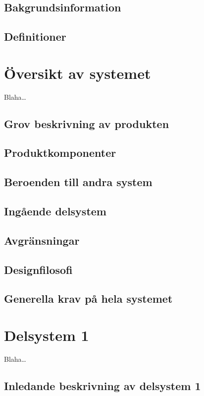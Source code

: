 \documentclass[a4paper,12pt]{article}
\begin{document}
\subsection{Bakgrundsinformation}
\subsection{Definitioner}

\section{Översikt av systemet}

Blaha\dots

\subsection{Grov beskrivning av produkten}
\subsection{Produktkomponenter}
\subsection{Beroenden till andra system}
\subsection{Ingående delsystem}
\subsection{Avgränsningar}
\subsection{Designfilosofi}
\subsection{Generella krav på hela systemet}


\section{Delsystem 1}

Blaha\dots

\subsection{Inledande beskrivning av delsystem 1}
\end{document}

